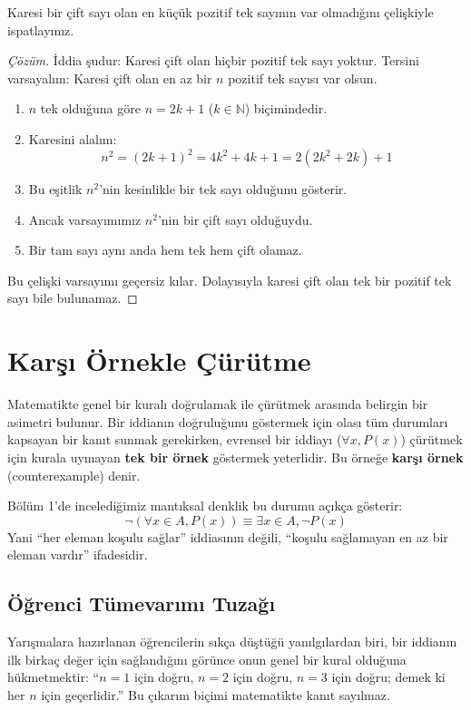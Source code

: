 \begin{example}
Karesi bir çift sayı olan en küçük pozitif tek sayının var olmadığını çelişkiyle ispatlayınız.
\end{example}
\begin{proof}[Çözüm]
İddia şudur: Karesi çift olan hiçbir pozitif tek sayı yoktur.
Tersini varsayalım: Karesi çift olan en az bir $n$ pozitif tek sayısı var olsun.
\begin{enumerate}
  \item $n$ tek olduğuna göre $n = 2k + 1$ ($k \in \mathbb{N}$) biçimindedir.
  \item Karesini alalım:
  \[ n^2 = (2k + 1)^2 = 4k^2 + 4k + 1 = 2(2k^2 + 2k) + 1 \]
  \item Bu eşitlik $n^2$'nin kesinlikle bir tek sayı olduğunu gösterir.
  \item Ancak varsayımımız $n^2$'nin bir çift sayı olduğuydu.
  \item Bir tam sayı aynı anda hem tek hem çift olamaz.
\end{enumerate}
Bu çelişki varsayımı geçersiz kılar. Dolayısıyla karesi çift olan tek bir pozitif tek sayı bile bulunamaz.
\end{proof}


\section{Karşı Örnekle Çürütme}

Matematikte genel bir kuralı doğrulamak ile çürütmek arasında belirgin bir asimetri bulunur. Bir iddianın doğruluğunu göstermek için olası tüm durumları kapsayan bir kanıt sunmak gerekirken, evrensel bir iddiayı ($\forall x, P(x)$) çürütmek için kurala uymayan \textbf{tek bir örnek} göstermek yeterlidir. Bu örneğe \textbf{karşı örnek} (counterexample) denir.

Bölüm 1'de incelediğimiz mantıksal denklik bu durumu açıkça gösterir:
\[ \neg(\forall x \in A, P(x)) \equiv \exists x \in A, \neg P(x) \]
Yani ``her eleman koşulu sağlar'' iddiasının değili, ``koşulu sağlamayan en az bir eleman vardır'' ifadesidir.

\subsection{Öğrenci Tümevarımı Tuzağı}

Yarışmalara hazırlanan öğrencilerin sıkça düştüğü yanılgılardan biri, bir iddianın ilk birkaç değer için sağlandığını görünce onun genel bir kural olduğuna hükmetmektir: ``$n=1$ için doğru, $n=2$ için doğru, $n=3$ için doğru; demek ki her $n$ için geçerlidir.'' Bu çıkarım biçimi matematikte kanıt sayılmaz.

